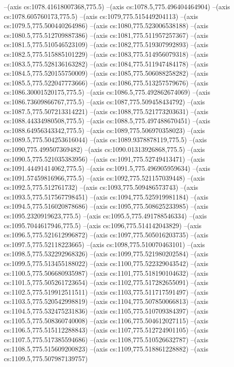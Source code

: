 --(axis cs:1078.41618007368,775.5)
--(axis cs:1078.5,775.496404464904)
--(axis cs:1078.605760173,775.5)
--(axis cs:1079,775.515449204113)
--(axis cs:1079.5,775.500440264986)
--(axis cs:1080,775.523006538188)
--(axis cs:1080.5,775.512709887386)
--(axis cs:1081,775.511957257367)
--(axis cs:1081.5,775.510546523109)
--(axis cs:1082,775.519307992893)
--(axis cs:1082.5,775.515885101229)
--(axis cs:1083,775.514956079318)
--(axis cs:1083.5,775.528136163282)
--(axis cs:1084,775.511947484178)
--(axis cs:1084.5,775.520155750009)
--(axis cs:1085,775.506088258282)
--(axis cs:1085.5,775.522047773666)
--(axis cs:1086,775.513257579676)
--(axis cs:1086.30001520175,775.5)
--(axis cs:1086.5,775.492862674069)
--(axis cs:1086.73609866767,775.5)
--(axis cs:1087,775.509458434792)
--(axis cs:1087.5,775.507213314221)
--(axis cs:1088,775.521773203631)
--(axis cs:1088.44334980508,775.5)
--(axis cs:1088.5,775.497488670451)
--(axis cs:1088.64956343342,775.5)
--(axis cs:1089,775.506970358023)
--(axis cs:1089.5,775.504253616044)
--(axis cs:1089.9378878119,775.5)
--(axis cs:1090,775.499507369482)
--(axis cs:1090.01313926868,775.5)
--(axis cs:1090.5,775.521035383956)
--(axis cs:1091,775.52749413471)
--(axis cs:1091.44491414062,775.5)
--(axis cs:1091.5,775.496905959634)
--(axis cs:1091.57459816966,775.5)
--(axis cs:1092,775.521157039448)
--(axis cs:1092.5,775.512761732)
--(axis cs:1093,775.509486573743)
--(axis cs:1093.5,775.517567798451)
--(axis cs:1094,775.525919981184)
--(axis cs:1094.5,775.516020878686)
--(axis cs:1095,775.508625233985)
--(axis cs:1095.2320919623,775.5)
--(axis cs:1095.5,775.491788546334)
--(axis cs:1095.7044617946,775.5)
--(axis cs:1096,775.514142043829)
--(axis cs:1096.5,775.521612996872)
--(axis cs:1097,775.505016203735)
--(axis cs:1097.5,775.52118223665)
--(axis cs:1098,775.510070463101)
--(axis cs:1098.5,775.532292968326)
--(axis cs:1099,775.521980202584)
--(axis cs:1099.5,775.513455188022)
--(axis cs:1100,775.522329043542)
--(axis cs:1100.5,775.506680935987)
--(axis cs:1101,775.518190104632)
--(axis cs:1101.5,775.505261723654)
--(axis cs:1102,775.517282655091)
--(axis cs:1102.5,775.519912511511)
--(axis cs:1103,775.511717591497)
--(axis cs:1103.5,775.520542998819)
--(axis cs:1104,775.507850066813)
--(axis cs:1104.5,775.532475231836)
--(axis cs:1105,775.510709384397)
--(axis cs:1105.5,775.508360740008)
--(axis cs:1106,775.504612027115)
--(axis cs:1106.5,775.515112288843)
--(axis cs:1107,775.512724901105)
--(axis cs:1107.5,775.517385594686)
--(axis cs:1108,775.510526632787)
--(axis cs:1108.5,775.515609200823)
--(axis cs:1109,775.518861228882)
--(axis cs:1109.5,775.507987139757)
